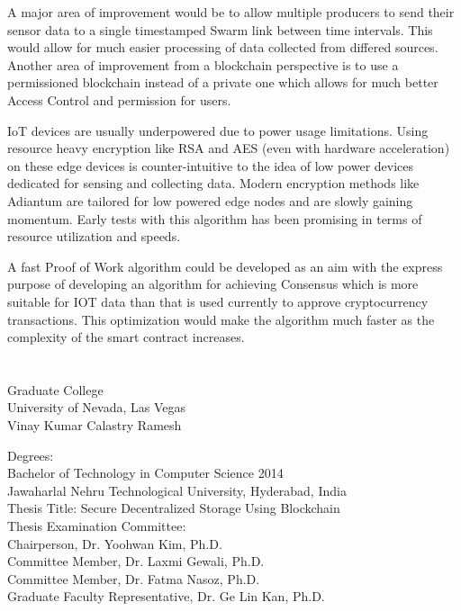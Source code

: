 \documentclass[11pt,openright]{report}
\begin{document}
A major area of improvement would be to allow multiple producers to send their sensor data to a single timestamped Swarm link between time intervals. This would allow for much easier processing of data collected from differed sources.
 Another area of improvement from a blockchain perspective is to use a permissioned blockchain instead of a private one which allows for much better Access Control and permission for users.

IoT devices are usually underpowered due to power usage limitations. Using resource heavy encryption like RSA and AES (even with hardware acceleration) on these edge devices is counter-intuitive to the idea of low power devices dedicated for sensing and collecting data. Modern encryption methods like Adiantum are tailored for low powered edge nodes and are slowly gaining momentum. Early tests with this algorithm has been promising in terms of resource utilization and speeds.

A fast Proof of Work algorithm could be developed as an aim with the express purpose of developing an algorithm for achieving Consensus which is more suitable for IOT data than that is used currently to approve cryptocurrency transactions. This optimization would make the algorithm much faster as the complexity of the smart contract increases.







\vita
\chapter{} %
\linespread{1.3} 
\begin{center}
Graduate College\\
University of Nevada, Las Vegas\\[1cm]
Vinay Kumar Calastry Ramesh\\[1cm]
\end{center}

\noindent Degrees:\\
\indent Bachelor of Technology in Computer Science 2014\\
\indent Jawaharlal Nehru Technological University, Hyderabad, India\\

\noindent Thesis Title: Secure Decentralized Storage Using Blockchain\\

\noindent Thesis Examination Committee:\\
\indent Chairperson, Dr. Yoohwan Kim, Ph.D.\\
\indent Committee Member, Dr. Laxmi Gewali, Ph.D.\\
\indent Committee Member, Dr. Fatma Nasoz, Ph.D.\\
\indent Graduate Faculty Representative, Dr. Ge Lin Kan, Ph.D.\\
\end{document}
